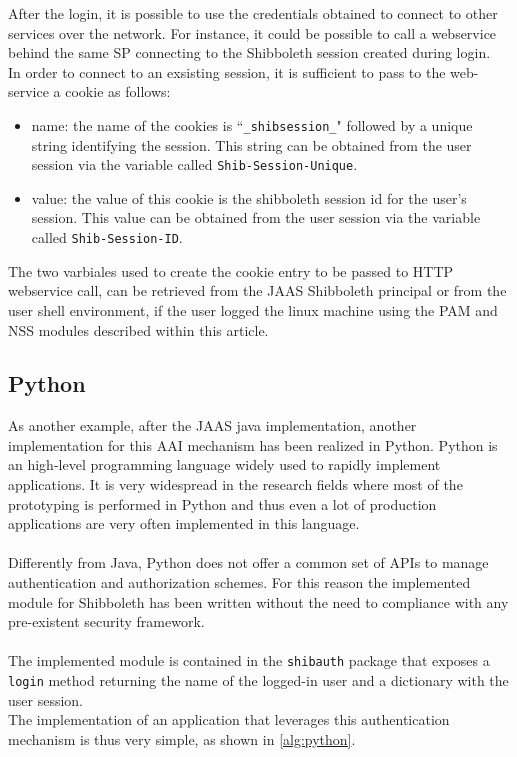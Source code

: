 After the login, it is possible to use the credentials obtained to connect to other services over the network.
For instance, it could be possible to call a webservice behind the same SP connecting to the Shibboleth session
created during login.\\
In order to connect to an exsisting session, it is sufficient to pass to the web-service a cookie as follows:
\begin{itemize}
\item name: the name of the cookies is ``\texttt{\_shibsession\_}" followed by a unique string identifying the session.
This string can be obtained from the user session via the variable called \texttt{Shib-Session-Unique}.
\item value: the value of this cookie is the shibboleth session id for the user's session.
This value can be obtained from the user session via the variable called \texttt{Shib-Session-ID}.
\end{itemize}
The two varbiales used to create the cookie entry to be passed to HTTP webservice call, can be retrieved from the
JAAS Shibboleth principal or from the user shell environment, if the user logged the linux machine using
the PAM and NSS modules described within this article.

\label{sec:python}
\subsection{Python}
As another example, after the JAAS java implementation, another implementation for this AAI mechanism has been realized
in Python.
Python is an high-level programming language widely used to rapidly implement applications.
It is very widespread in the research fields where most of the prototyping is performed in Python and thus even a lot
of production applications are very often implemented in this language.\\
\\
Differently from Java, Python does not offer a common set of APIs to manage authentication and authorization schemes.
For this reason the implemented module for Shibboleth has been written without the need to compliance with any
pre-existent security framework.\\
\\
The implemented module is contained in the \texttt{shibauth} package that exposes a \texttt{login} method returning
the name of the logged-in user and a dictionary with the user session.\\
The implementation of an application that leverages this authentication mechanism is thus very simple, as shown
in \ref{alg:python}.

